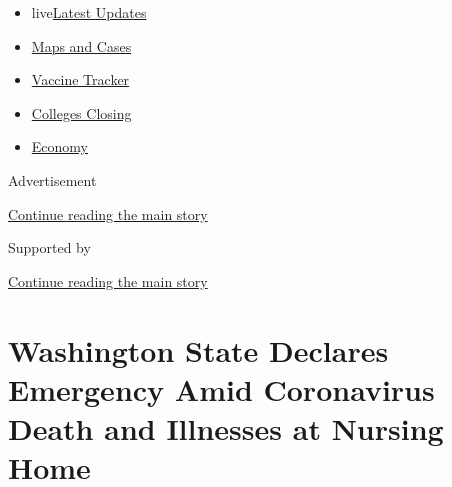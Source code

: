 \begin{itemize}
\tightlist
\item
  live\href{https://www.nytimes3xbfgragh.onion/2020/08/21/world/covid-19-coronavirus.html?name=styln-coronavirus-national\&region=TOP_BANNER\&variant=undefined\&block=storyline_menu_recirc\&action=click\&pgtype=Article\&impression_id=12f52011-e398-11ea-950f-95281846e31d}{Latest
  Updates}
\item
  \href{https://www.nytimes3xbfgragh.onion/interactive/2020/us/coronavirus-us-cases.html?name=styln-coronavirus-national\&region=TOP_BANNER\&variant=undefined\&block=storyline_menu_recirc\&action=click\&pgtype=Article\&impression_id=12f52012-e398-11ea-950f-95281846e31d}{Maps
  and Cases}
\item
  \href{https://www.nytimes3xbfgragh.onion/interactive/2020/science/coronavirus-vaccine-tracker.html?name=styln-coronavirus-national\&region=TOP_BANNER\&variant=undefined\&block=storyline_menu_recirc\&action=click\&pgtype=Article\&impression_id=12f52013-e398-11ea-950f-95281846e31d}{Vaccine
  Tracker}
\item
  \href{https://www.nytimes3xbfgragh.onion/2020/08/19/us/colleges-closing-covid.html?name=styln-coronavirus-national\&region=TOP_BANNER\&variant=undefined\&block=storyline_menu_recirc\&action=click\&pgtype=Article\&impression_id=12f54720-e398-11ea-950f-95281846e31d}{Colleges
  Closing}
\item
  \href{https://www.nytimes3xbfgragh.onion/live/2020/08/20/business/stock-market-today-coronavirus?name=styln-coronavirus-national\&region=TOP_BANNER\&variant=undefined\&block=storyline_menu_recirc\&action=click\&pgtype=Article\&impression_id=12f54721-e398-11ea-950f-95281846e31d}{Economy}
\end{itemize}

Advertisement

\protect\hyperlink{after-top}{Continue reading the main story}

Supported by

\protect\hyperlink{after-sponsor}{Continue reading the main story}

\hypertarget{washington-state-declares-emergency-amid-coronavirus-death-and-illnesses-at-nursing-home}{%
\section{Washington State Declares Emergency Amid Coronavirus Death and
Illnesses at Nursing
Home}\label{washington-state-declares-emergency-amid-coronavirus-death-and-illnesses-at-nursing-home}}

